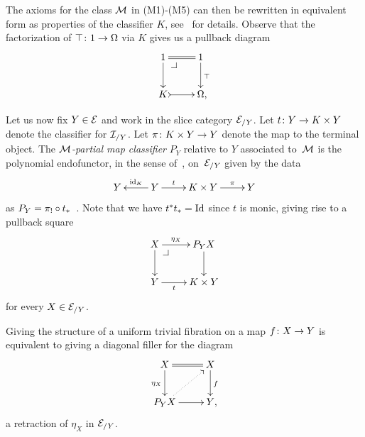 \documentclass[reqno,10pt,a4paper,oneside,draft]{amsart}
\begin{document}
{{The axioms for the class $\cal{M}$ in (M1)-(M5) can then be rewritten in equivalent form as properties of the classifier $K$, see~\cite{PittsAM:aximct} for details.
Observe that the factorization of $\top \co 1 \to \Omega$ via $K$ gives us a pullback diagram
\begin{equation} \label{partial-map-classifier:0}
\begin{gathered}
\xymatrix{
  1
  \ar@{=}[r]
  \ar[d]
  \pullback{dr}
&
  1
  \ar[d]^{\top}
\\
  K
  \ar@{>->}[r]
&
  \Omega \rlap{,}
}
\end{gathered}
\end{equation}

Let us now fix $Y \in \cal{E}$ and work in the slice category $\cal{E}_{/Y}$.
Let $t \co Y \to K \times Y$ denote the classifier for $\cal{I}_{/Y}$.
Let $\pi \co K \times Y \to Y$ denote the map to the terminal object.
The \emph{$\cal{M}$-partial map classifier} $P_Y$ relative to $Y$ associated to~$\cal{M}$ is the polynomial endofunctor, in the sense of~\cite{gambino-kock}, on~$\cal{E}_{/Y}$ given by the data
\[
\xymatrix{
  Y
&
  Y
  \ar[l]_-{\id_K}
  \ar[r]^-{t}
&
  K \times Y
  \ar[r]^-{\pi}
&
  Y
}
\]
as $P_Y = \pi_! \cc t_*$~\cite[A2.4]{johnstone:elephant}.
Note that we have $t^* t_* = \Id$ since $t$ is monic, giving rise to a pullback square
\begin{equation} \label{partial-map-classifier:1}
\begin{gathered}
\xymatrix{
  X
  \ar[r]^-{\eta_X}
  \ar[d]
  \pullback{dr}
&
  P_Y X
  \ar[d]
\\
  Y
  \ar[r]_-{t}
&
  K \times Y
}
\end{gathered}
\end{equation}
for every $X \in \cal{E}_{/Y}$.

\begin{theorem} \label{thm:part-map-character}
Giving the structure of a uniform trivial fibration on a map $f \co X \to Y$ is equivalent to giving a diagonal filler for the diagram
\begin{equation*}
\begin{gathered}
\xymatrix{
  X
  \ar@{=}[r]
  \ar[d]_{\eta_X}
&
  X
  \ar[d]^{f}
\\
  P_Y X
  \ar[r]
  \ar@{.>}[ur]
&
  Y
\rlap{,}}
\end{gathered}
\end{equation*}
\ie a retraction of $\eta_X$ in $\cal{E}_{/Y}$.
\end{theorem}

}}
\end{document}
